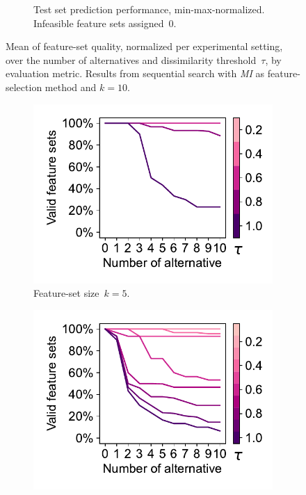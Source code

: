\documentclass{article}
\theoremstyle{definition}
\begin{document}
\begin{figure}[p]
\begin{subfigure}[t]{0.48\textwidth}
		\caption{
			Test set prediction performance, min-max-normalized.
			Infeasible feature sets assigned~0.
		}
		\label{fig:afs:impact-num-alternatives-tau-decision-tree-test-mcc-min-max-fillna}
	\end{subfigure}
	\caption{
		Mean of feature-set quality, normalized per experimental setting, over the number of alternatives and dissimilarity threshold~$\tau$, by evaluation metric.
		Results from sequential search with \emph{MI} as feature-selection method and $k=10$.
	}
	\label{fig:afs:impact-num-alternatives-tau-quality}
\end{figure}

\begin{figure}[htbp]
	\centering
	\begin{subfigure}[t]{0.48\textwidth}
		\centering
		\includegraphics[width=\textwidth, trim=15 15 10 15, clip]{plots/impact-num-alternatives-tau-optimization-status-k-5.pdf}
		\caption{Feature-set size~$k=5$.}
		\label{fig:afs:impact-num-alternatives-tau-optimization-status-k-5}
	\end{subfigure}
	\hfill
	\begin{subfigure}[t]{0.48\textwidth}
		\centering
		\includegraphics[width=\textwidth, trim=15 15 10 15, clip]{plots/impact-num-alternatives-tau-optimization-status-k-10.pdf}

\end{subfigure}
\end{figure}
\end{document}
